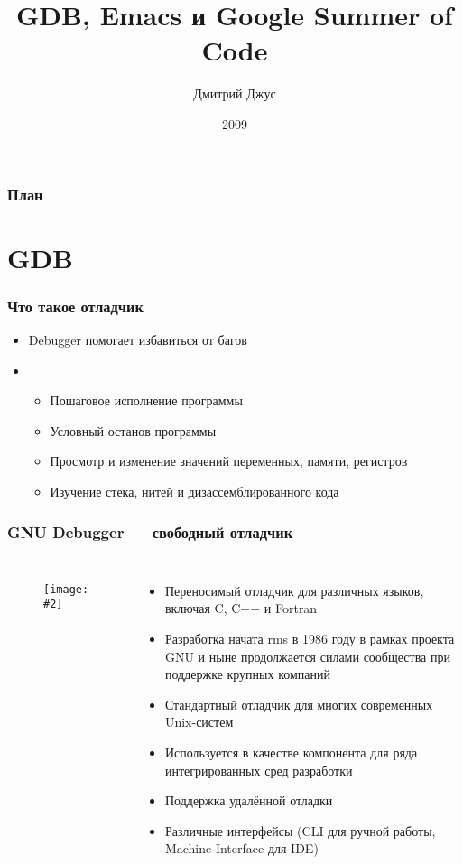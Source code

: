 \documentclass[onlymath]{beamer}
\title{GDB, Emacs и Google Summer of Code }
\author{Дмитрий Джус}
\institute{МГТУ им. Н.Э.Баумана}
\date{2009}
\newcommand{\cenfig}[2]{\begin{figure}\centering\texttt{[image: \#2]}
  \end{figure}}
\begin{document}
\begin{frame}
  \titlepage
\end{frame}

\begin{frame}
  \frametitle{План}
  \tableofcontents
\end{frame}

\section{GDB}

\begin{frame}
  \frametitle{Что такое отладчик}
  \begin{itemize}
    \item Debugger помогает избавиться от багов
    \item \begin{itemize}
      \item Пошаговое исполнение программы
      \item Условный останов программы
      \item Просмотр и изменение значений переменных, памяти,
        регистров
      \item Изучение стека, нитей и дизассемблированного кода
      \end{itemize}
    \end{itemize}
\end{frame}

\begin{frame}
  \frametitle{GNU Debugger — свободный отладчик}
  \begin{columns}
    \cenfig{0.5}{archer.jpg}

  \begin{itemize}
  \item Переносимый отладчик для различных языков, включая C, C++ и Fortran
  \item Разработка начата rms в 1986 году в рамках проекта GNU и ныне
    продолжается силами сообщества при поддержке крупных компаний
  \item Стандартный отладчик для многих современных Unix-систем
  \item Используется в качестве компонента для ряда интегрированных
    сред разработки
  \item Поддержка удалённой отладки
  \item Различные интерфейсы (CLI для ручной работы, Machine Interface
    для IDE)
  \end{itemize}
\end{columns}
\end{frame}
\end{document}
